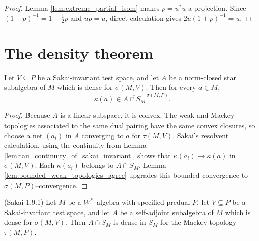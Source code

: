 \begin{proof}
  \leanok
  Lemma \ref{lem:extreme_partial_isom} makes $p=u^{*}u$ a projection.  Since
  $(1+p)^{-1}=1-\tfrac12p$ and $up=u$, direct calculation gives
  $2u(1+p)^{-1}=u$.
\end{proof}

\section{The density theorem}

\begin{proposition}
  \label{prop:kaplansky_transform_in_ball_closure}
  \leanok
  Let $V\subseteq P$ be a Sakai-invariant test space, and let $A$ be a norm-closed star
  subalgebra of $M$ which is dense for $\sigma(M,V)$.  Then for every $a\in M$,
  \[
    \kappa(a)\in\overline{A\cap S_M}^{\,\sigma(M,P)}.
  \]
\end{proposition}

\begin{proof}
  \leanok
  Because $A$ is a linear subspace, it is convex.  The weak and Mackey topologies associated to
  the same dual pairing have the same convex closures, so choose a net $(a_i)$ in $A$ converging to
  $a$ for $\tau(M,V)$.  Sakai's resolvent calculation, using the continuity from Lemma
  \ref{lem:tau_continuity_of_sakai_invariant}, shows that
  $\kappa(a_i)\to\kappa(a)$ in $\sigma(M,V)$.  Each $\kappa(a_i)$ belongs to $A\cap S_M$.
  Lemma \ref{lem:bounded_weak_topologies_agree} upgrades this bounded convergence to
  $\sigma(M,P)$--convergence.
\end{proof}

\begin{theorem}
  \label{thm:kaplansky_density_Sak_1_9_1} (Sakai 1.9.1)
  \leanok
  Let $M$ be a $W^{*}$--algebra with specified predual $P$, let $V\subseteq P$ be a
  Sakai-invariant test space, and let $A$ be a self-adjoint subalgebra of $M$ which is dense for
  $\sigma(M,V)$.  Then $A\cap S_M$ is dense in $S_M$ for the Mackey topology
  $\tau(M,P)$.
\end{theorem}

